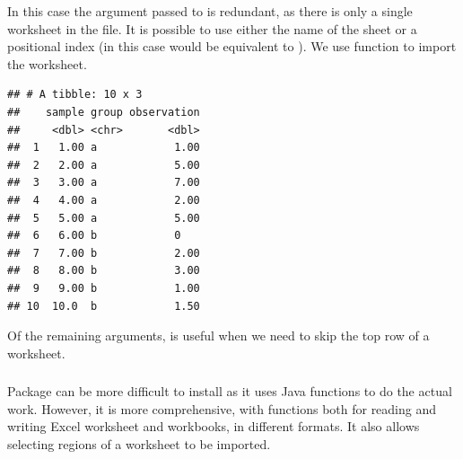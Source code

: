 \documentclass[krantz2,ChapterTOCs]{krantz}\usepackage{knitr}
\begin{document}
In this case the argument passed to  is redundant, as there is only a single worksheet in the file. It is possible to use either the name of the sheet or a positional index (in this case  would be equivalent to ). We use function  to import the worksheet.
\begin{knitrout}\footnotesize
{}\color{fgcolor}\begin{kframe}
\begin{alltt}
 \hlkwb{<-} \hlstd{(}\hlstd{,}  \hlstd{=} \hlstd{)}
\end{alltt}
\begin{verbatim}
## # A tibble: 10 x 3
##    sample group observation
##     <dbl> <chr>       <dbl>
##  1   1.00 a            1.00
##  2   2.00 a            5.00
##  3   3.00 a            7.00
##  4   4.00 a            2.00
##  5   5.00 a            5.00
##  6   6.00 b            0   
##  7   7.00 b            2.00
##  8   8.00 b            3.00
##  9   9.00 b            1.00
## 10  10.0  b            1.50
\end{verbatim}
\end{kframe}
\end{knitrout}

Of the remaining arguments,  is useful when we need to skip the top row of a worksheet.

\subsubsection['xlsx']{}

Package  can be more difficult to install as it uses Java functions to do the actual work. However, it is more comprehensive, with functions both for reading and writing Excel worksheet and workbooks, in different formats. It also allows selecting regions of a worksheet to be imported.
\end{document}
